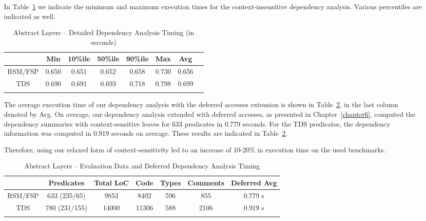 \documentclass[11pt]{article}
\begin{document}
In Table~\ref{res:statsdep2} we indicate the minimum and maximum execution times
for the context-insensitive dependency analysis. Various percentiles
are indicated as well. 

\begin{table}[hbtp]
\caption[Abstract Layers -- Detailed Dependency Analysis Timing]
{Abstract Layers -- Detailed Dependency Analysis Timing (in seconds)}
\centering
\begin{tabular}{cccccccc} \toprule
    {}  & {Min} & {10\%ile} & {50\%ile} & {90\%ile} & {Max} & {Avg} \\ \midrule
RSM/FSP & 0.650 & 0.651     & 0.652     & 0.658     & 0.730 & 0.656 \\ \midrule
TDS     & 0.690 & 0.691     & 0.693     & 0.718     & 0.798 & 0.699 \\ \bottomrule\\
\end{tabular}
\label{res:statsdep2}
\end{table}

The average execution time of our dependency 
analysis with the deferred accesses extension is shown in Table~\ref{res:statsdef1},
in the last column denoted by Avg. On average, our dependency analysis extended with
deferred accesses, as presented in Chapter~\ref{chapter6}, computed the dependency 
summaries with context-sensitive leaves for 633 predicates in
0.779 seconds. For the TDS predicates, the dependency information was computed in
0.919 seconds on average. These results are indicated in Table~\ref{res:statsdef1}.

Therefore, using our relaxed form of context-sensitivity led to an increase of 
\mbox{10-20\%} in execution time on the used benchmarks.  

\begin{table}[hbtp]
\caption{Abstract Layers -- Evaluation Data and Deferred Dependency Analysis Timing}
\centering
\begin{tabular}{ccccccc} \toprule
    {}      & {Predicates}  & {Total LoC} & {Code} & {Types} & {Comments} & {Deferred Avg}  
                                                                                    \\ \midrule
    RSM/FSP & 633 (235/65)  & 9853        & 8402   & 596     & 855        & 0.779 s \\ \midrule
    TDS     & 780 (231/155) & 14000       & 11306  & 588     & 2106       & 0.919 s \\ \bottomrule\\
\end{tabular}
\label{res:statsdef1}
\end{table}
\end{document}
